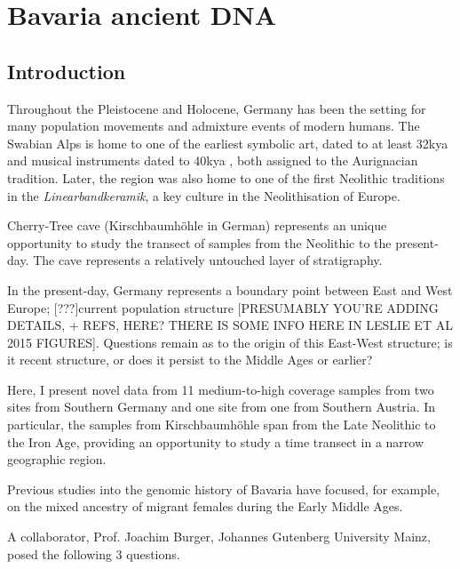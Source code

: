\chapter{Bavaria ancient DNA}
\label{chapterlabel4}

\section{Introduction}

Throughout the Pleistocene and Holocene, Germany has been the setting for many population movements and admixture events of modern humans. The Swabian Alps is home to one of the earliest symbolic art, dated to at least 32kya \cite{conard2009female} and musical instruments dated to 40kya \cite{conard2009new}, both assigned to the Aurignacian tradition. Later, the region was also home to one of the first Neolithic traditions in the \textit{Linearbandkeramik}, a key culture in the Neolithisation of Europe. 

Cherry-Tree cave (Kirschbaumhöhle in German) represents an unique opportunity to study the transect of samples from the Neolithic to the present-day. The cave represents a relatively untouched layer of stratigraphy.

In the present-day, Germany represents a boundary point between East and West Europe; {\color{red}[???]current population structure [PRESUMABLY YOU'RE ADDING DETAILS, + REFS, HERE? THERE IS SOME INFO HERE IN LESLIE ET AL 2015 FIGURES]}. Questions remain as to the origin of this East-West structure; is it recent structure, or does it persist to the Middle Ages or earlier? 

Here, I present novel data from 11 medium-to-high coverage samples from two sites from Southern Germany and one site from one from Southern Austria. In particular, the samples from Kirschbaumhöhle span from the Late Neolithic to the Iron Age, providing an opportunity to study a time transect in a narrow geographic region. 

Previous studies into the genomic history of Bavaria have focused, for example, on the mixed ancestry of migrant females during the Early Middle Ages.

A collaborator, Prof. Joachim Burger, Johannes Gutenberg University Mainz, posed the following 3 questions. 


